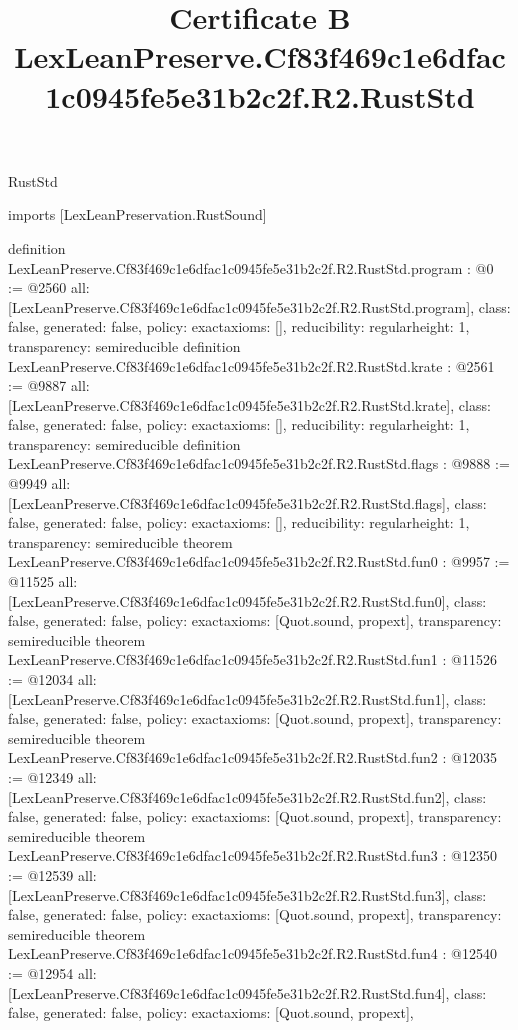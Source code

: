 \begin{lexlean}{RustStd}
\title{Certificate B LexLeanPreserve.Cf83f469c1e6dfac1c0945fe5e31b2c2f.R2.RustStd}
\begin{coremodule}
imports [LexLeanPreservation.RustSound]

definition LexLeanPreserve.Cf83f469c1e6dfac1c0945fe5e31b2c2f.R2.RustStd.program : @0 := @2560 {
  all: [LexLeanPreserve.Cf83f469c1e6dfac1c0945fe5e31b2c2f.R2.RustStd.program],
  class: false,
  generated: false,
  policy: exact{axioms: []},
  reducibility: regular{height: 1},
  transparency: semireducible
}
definition LexLeanPreserve.Cf83f469c1e6dfac1c0945fe5e31b2c2f.R2.RustStd.krate : @2561 := @9887 {
  all: [LexLeanPreserve.Cf83f469c1e6dfac1c0945fe5e31b2c2f.R2.RustStd.krate],
  class: false,
  generated: false,
  policy: exact{axioms: []},
  reducibility: regular{height: 1},
  transparency: semireducible
}
definition LexLeanPreserve.Cf83f469c1e6dfac1c0945fe5e31b2c2f.R2.RustStd.flags : @9888 := @9949 {
  all: [LexLeanPreserve.Cf83f469c1e6dfac1c0945fe5e31b2c2f.R2.RustStd.flags],
  class: false,
  generated: false,
  policy: exact{axioms: []},
  reducibility: regular{height: 1},
  transparency: semireducible
}
theorem LexLeanPreserve.Cf83f469c1e6dfac1c0945fe5e31b2c2f.R2.RustStd.fun0 : @9957 := @11525 {
  all: [LexLeanPreserve.Cf83f469c1e6dfac1c0945fe5e31b2c2f.R2.RustStd.fun0],
  class: false,
  generated: false,
  policy: exact{axioms: [Quot.sound, propext]},
  transparency: semireducible
}
theorem LexLeanPreserve.Cf83f469c1e6dfac1c0945fe5e31b2c2f.R2.RustStd.fun1 : @11526 := @12034 {
  all: [LexLeanPreserve.Cf83f469c1e6dfac1c0945fe5e31b2c2f.R2.RustStd.fun1],
  class: false,
  generated: false,
  policy: exact{axioms: [Quot.sound, propext]},
  transparency: semireducible
}
theorem LexLeanPreserve.Cf83f469c1e6dfac1c0945fe5e31b2c2f.R2.RustStd.fun2 : @12035 := @12349 {
  all: [LexLeanPreserve.Cf83f469c1e6dfac1c0945fe5e31b2c2f.R2.RustStd.fun2],
  class: false,
  generated: false,
  policy: exact{axioms: [Quot.sound, propext]},
  transparency: semireducible
}
theorem LexLeanPreserve.Cf83f469c1e6dfac1c0945fe5e31b2c2f.R2.RustStd.fun3 : @12350 := @12539 {
  all: [LexLeanPreserve.Cf83f469c1e6dfac1c0945fe5e31b2c2f.R2.RustStd.fun3],
  class: false,
  generated: false,
  policy: exact{axioms: [Quot.sound, propext]},
  transparency: semireducible
}
theorem LexLeanPreserve.Cf83f469c1e6dfac1c0945fe5e31b2c2f.R2.RustStd.fun4 : @12540 := @12954 {
  all: [LexLeanPreserve.Cf83f469c1e6dfac1c0945fe5e31b2c2f.R2.RustStd.fun4],
  class: false,
  generated: false,
  policy: exact{axioms: [Quot.sound, propext]},
}
\end{coremodule}
\end{lexlean}

